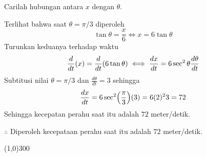 \begin{enumerate}[leftmargin=*, label={\arabic*}.]
Carilah hubungan antara $x$ dengan $\theta$.



Terlihat bahwa saat $\theta = \pi/3$ diperoleh
\[
\tan \theta = \frac{x}{6} \iff x = 6\tan\theta
\]
Turunkan keduanya terhadap waktu
\[
\drv{t}{x} = \drv{t}{6\tan\theta} \iff \frac{dx}{dt} = 6\sec^{2}\theta\frac{d\theta}{dt}
\]
Subtitusi nilai $\theta = \pi/3$ dan $\frac{d\theta}{dt}=3$ sehingga
\[
\frac{dx}{dt} = 6\sec^{2}\brk*{\frac{\pi}{3}}(3) = 6(2)^{2}3 = 72
\]
Sehingga kecepatan perahu saat itu adalah $72$ meter/detik.

$\therefore$ Diperoleh kecepataan perahu saat itu adalah $72$ meter/detik.

\end{enumerate}

\begin{center}\line(1,0){300}\end{center}
